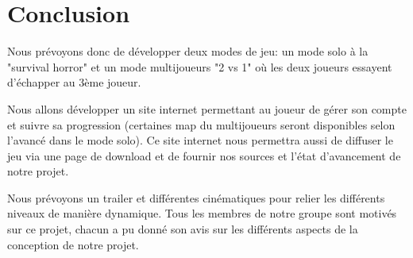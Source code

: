 \documentclass[titlepage, 13px, a4paper]{article}
\begin{document}
\newpage

\part{Conclusion}
Nous prévoyons donc de développer deux modes de jeu: un mode solo à la "survival horror" et un mode 
multijoueurs "2 vs 1" où les deux joueurs essayent d'échapper au 3ème joueur. 

Nous allons développer un 
site internet permettant au joueur de gérer son compte et suivre sa progression (certaines map du multijoueurs seront
disponibles selon l'avancé dans le mode solo).
Ce site internet nous permettra aussi de diffuser le jeu via une page de download et de fournir nos sources et l'état d'avancement de notre projet.  

Nous prévoyons un trailer et différentes cinématiques
pour relier les différents niveaux de manière dynamique. Tous les membres de notre groupe sont motivés
sur ce projet, chacun a pu donné son avis sur les différents aspects de la conception de notre projet. 	
\end{document}
